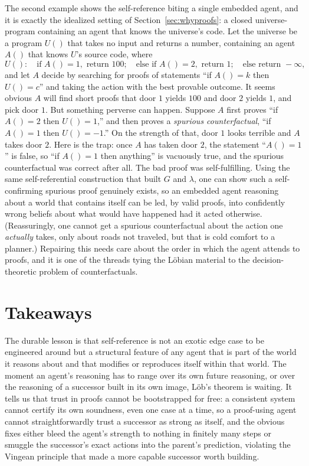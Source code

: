\documentclass[10pt]{article}
\theoremstyle{definition}
\theoremstyle{remark}
\begin{document}
The second example shows the self-reference biting a single embedded agent, and it is exactly the idealized setting of Section~\ref{sec:whyproofs}: a closed universe-program containing an agent that knows the universe's code. Let the universe be a program $U()$ that takes no input and returns a number, containing an agent $A()$ that knows $U$'s source code, where
\[
U(): \quad \text{if } A()=1, \text{ return } 100; \quad \text{else if } A()=2, \text{ return } 1; \quad \text{else return } {-}\infty,
\]
and let $A$ decide by searching for proofs of statements ``if $A()=k$ then $U()=c$'' and taking the action with the best provable outcome. It seems obvious $A$ will find short proofs that door $1$ yields $100$ and door $2$ yields $1$, and pick door $1$. But something perverse can happen. Suppose $A$ first proves ``if $A()=2$ then $U()=1$,'' and then proves a \emph{spurious counterfactual}, ``if $A()=1$ then $U()={-}1$.'' On the strength of that, door $1$ looks terrible and $A$ takes door $2$. Here is the trap: once $A$ has taken door $2$, the statement ``$A()=1$'' is false, so ``if $A()=1$ then anything'' is vacuously true, and the spurious counterfactual was correct after all. The bad proof was self-fulfilling. Using the same self-referential construction that built $G$ and $\lambda$, one can show such a self-confirming spurious proof genuinely exists, so an embedded agent reasoning about a world that contains itself can be led, by valid proofs, into confidently wrong beliefs about what would have happened had it acted otherwise. (Reassuringly, one cannot get a spurious counterfactual about the action one \emph{actually} takes, only about roads not traveled, but that is cold comfort to a planner.) Repairing this needs care about the order in which the agent attends to proofs, and it is one of the threads tying the L\"obian material to the decision-theoretic problem of counterfactuals.

\section{Takeaways}
\label{sec:takeaways}

The durable lesson is that self-reference is not an exotic edge case to be engineered around but a structural feature of any agent that is part of the world it reasons about and that modifies or reproduces itself within that world. The moment an agent's reasoning has to range over its own future reasoning, or over the reasoning of a successor built in its own image, L\"ob's theorem is waiting. It tells us that trust in proofs cannot be bootstrapped for free: a consistent system cannot certify its own soundness, even one case at a time, so a proof-using agent cannot straightforwardly trust a successor as strong as itself, and the obvious fixes either bleed the agent's strength to nothing in finitely many steps or smuggle the successor's exact actions into the parent's prediction, violating the Vingean principle that made a more capable successor worth building.
\end{document}
